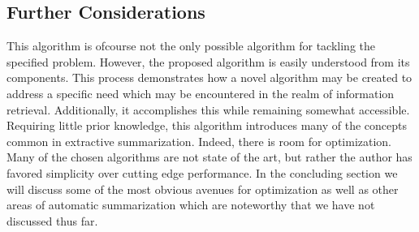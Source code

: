 \documentclass[11pt]{article}
\begin{document}
\subsection{Further Considerations}
\label{sec:org9c9c8be}
This algorithm is ofcourse not the only possible algorithm for tackling the specified problem. However, the proposed algorithm is easily understood from its components. This process demonstrates how a novel algorithm may be created to address a specific need which may be encountered in the realm of information retrieval. Additionally, it accomplishes this while remaining somewhat accessible. Requiring little prior knowledge, this algorithm introduces many of the concepts common in extractive summarization. Indeed, there is room for optimization. Many of the chosen algorithms are not state of the art, but rather the author has favored simplicity over cutting edge performance. In the concluding section we will discuss some of the most obvious avenues for optimization as well as other areas of automatic summarization which are noteworthy that we have not discussed thus far.
\end{document}
